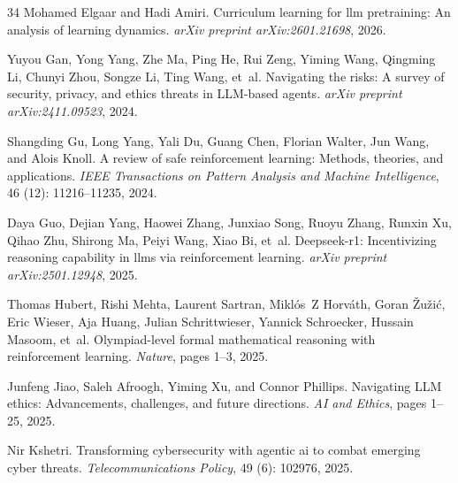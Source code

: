 \begin{thebibliography}{34}
Mohamed Elgaar and Hadi Amiri.
\newblock Curriculum learning for llm pretraining: An analysis of learning dynamics.
\newblock \emph{arXiv preprint arXiv:2601.21698}, 2026.

Yuyou Gan, Yong Yang, Zhe Ma, Ping He, Rui Zeng, Yiming Wang, Qingming Li, Chunyi Zhou, Songze Li, Ting Wang, et~al.
\newblock Navigating the risks: A survey of security, privacy, and ethics threats in {LLM}-based agents.
\newblock \emph{arXiv preprint arXiv:2411.09523}, 2024.

Shangding Gu, Long Yang, Yali Du, Guang Chen, Florian Walter, Jun Wang, and Alois Knoll.
\newblock A review of safe reinforcement learning: Methods, theories, and applications.
\newblock \emph{IEEE Transactions on Pattern Analysis and Machine Intelligence}, 46 (12): 11216--11235, 2024.

Daya Guo, Dejian Yang, Haowei Zhang, Junxiao Song, Ruoyu Zhang, Runxin Xu, Qihao Zhu, Shirong Ma, Peiyi Wang, Xiao Bi, et~al.
\newblock Deepseek-r1: Incentivizing reasoning capability in llms via reinforcement learning.
\newblock \emph{arXiv preprint arXiv:2501.12948}, 2025.

Thomas Hubert, Rishi Mehta, Laurent Sartran, Mikl{\'o}s~Z Horv{\'a}th, Goran {\v{Z}}u{\v{z}}i{\'c}, Eric Wieser, Aja Huang, Julian Schrittwieser, Yannick Schroecker, Hussain Masoom, et~al.
\newblock Olympiad-level formal mathematical reasoning with reinforcement learning.
\newblock \emph{Nature}, pages 1--3, 2025.

Junfeng Jiao, Saleh Afroogh, Yiming Xu, and Connor Phillips.
\newblock Navigating {LLM} ethics: Advancements, challenges, and future directions.
\newblock \emph{AI and Ethics}, pages 1--25, 2025.

Nir Kshetri.
\newblock Transforming cybersecurity with agentic ai to combat emerging cyber threats.
\newblock \emph{Telecommunications Policy}, 49 (6): 102976, 2025.


\end{thebibliography}
